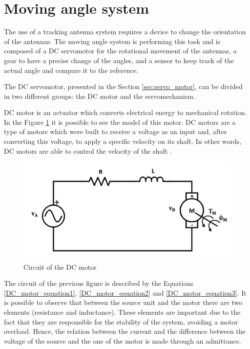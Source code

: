 
\section{Moving angle system}\label{sec:servo_model}


The use of a tracking antenna system requires a device to change the orientation of the antennas. The moving angle system is performing this task and is composed of a DC servomotor for the rotational movement of the antennas, a gear to have a precise change of the angles, and a sensor to keep track of the actual angle and compare it to the reference.

The DC servomotor, presented in the Section \ref{sec:servo_motor}, can be divided in two different groups: the DC motor and the servomechanism.

DC motor is an actuator which converts electrical energy to mechanical rotation. In the Figure \ref{dcmotor_circuit} it is possible to see the model of this motor. DC motors are a type of motors which were built to receive a voltage as an input and, after converting this voltage, to apply a specific velocity on its shaft. In other words, DC motors are able to control the velocity of the shaft \cite{modelingdc}.

\begin{figure}[H]
\centering
\includegraphics[scale=0.5]{figures/dcmotor_circuit.png}
\caption{Circuit of the DC motor}
\label{dcmotor_circuit}
\end{figure}

The circuit of the previous figure is described by the Equations \ref{DC_motor_equation1}, \ref{DC_motor_equation2} and \ref{DC_motor_equation3}. It is possible to observe that between the source unit and the motor there are two elements (resistance and inductance). These elements are important due to the fact that they are responsible for the stability of the system, avoiding a motor overload. Hence, the relation between the current and the difference between the voltage of the source and the one of the motor is made through an admittance.

